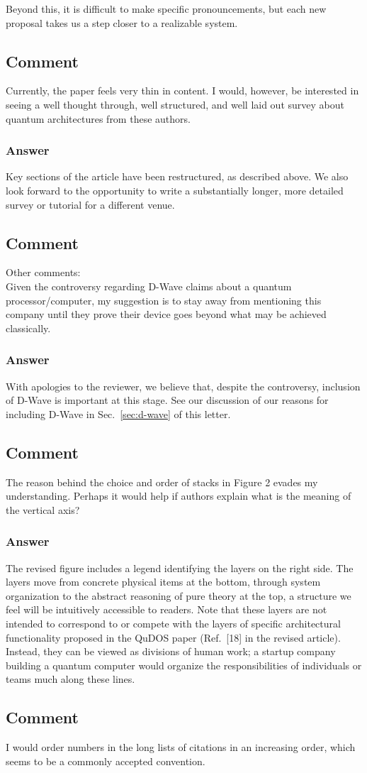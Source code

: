 \documentclass{article}
\newcommand{\comment}{\subsection{Comment}\em}
\newcommand{\answer}{\rm \subsubsection*{Answer}}
\begin{document}
Beyond this, it is difficult to make specific pronouncements, but each
new proposal takes us a step closer to a realizable system.

\comment

Currently, the paper feels very thin in content.  I would, however, be
interested in seeing a well thought through, well structured, and well
laid out survey about quantum architectures from these authors.

\answer

Key sections of the article have been restructured, as described
above.  We also look forward to the opportunity to write a
substantially longer, more detailed survey or tutorial for a different
venue.

\comment

Other comments:\\
Given the controversy regarding D-Wave claims about a quantum
processor/computer, my suggestion is to stay away from mentioning this
company until they prove their device goes beyond what may be achieved
classically.

\answer

With apologies to the reviewer, we believe that, despite the
controversy, inclusion of D-Wave is important at this stage.  See our
discussion of our reasons for including D-Wave in
Sec.~\ref{sec:d-wave} of this letter.

\comment

The reason behind the choice and order of stacks in Figure 2 evades my
understanding. Perhaps it would help if authors explain what is the
meaning of the vertical axis?

\answer

The revised figure includes a legend identifying the layers on the
right side.  The layers move from concrete physical items at the
bottom, through system organization to the abstract reasoning of pure
theory at the top, a structure we feel will be intuitively accessible
to readers.  Note that these layers are not intended to correspond to
or compete with the layers of specific architectural functionality
proposed in the QuDOS paper (Ref.~[18] in the revised article).
Instead, they can be viewed as divisions of human work; a startup
company building a quantum computer would organize the
responsibilities of individuals or teams much along these lines.

\comment

I would order numbers in the long lists of citations in an increasing
order, which seems to be a commonly accepted convention.
\end{document}
